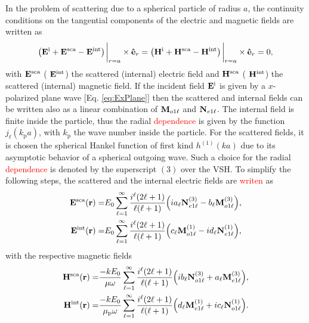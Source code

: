 In the problem of scattering due to a spherical particle of radius $a$, the continuity conditions on the tangential components of the electric and magnetic fields are written as
 \begin{align}
 \qty(\vb{E}^\text{i} + \vb{E}^\text{sca}- \vb{E}^\text{int})\eval_{r=a}\times \vu{e}_r  =
  \qty(\vb{H}^\text{i} + \vb{H}^\text{sca} - \vb{H}^\text{int})\eval_{r=a} \times\vu{e}_r = 0,
  \label{eq:contuinity}
 \end{align}
with  $\vb{E}^\text{sca}$ ( $\vb{E}^\text{int}$) the scattered (internal) electric field and  $\vb{H}^\text{sca}$ ( $\vb{H}^\text{int}$) the scattered (internal) magnetic field. If the incident field $\vb{E}^\text{i}$ is given by a $x$-polarized plane wave [Eq. \eqref{eq:ExPlane}] then the scattered and internal fields can be written also as a linear combination of $\vb{M}_{o1\ell}$ and $\vb{N}_{e1\ell}$. The internal field is finite inside the particle, thus the radial \textcolor{red}{dependence} is given by the function $j_\ell(k_\text{p} a)$, with $k_\text{p}$ the wave number inside the particle. For the scattered fields, it is chosen the spherical Hankel function of first kind $h^{(1)}(ka)$ due to its asymptotic behavior of a spherical outgoing wave. Such a choice for the radial \textcolor{red}{dependence} is denoted by the superscript $(3)$ over the VSH. To simplify the following steps, the scattered and the internal electric fields are \textcolor{red}{writen} as
  \begin{subequations}
 \begin{align}
 \vb{E}^\text{sca} (\vb{r})=& E_0 \sum_{\ell = 1}^\infty\frac{i^\ell(2\ell+1)}{\ell(\ell+1)}\qty(i a_\ell \vb{N}_{e1\ell}^{(3)} -b_\ell \vb{M}_{o1\ell}^{(3)}),
 \label{eq:EscaLC}\\
 \vb{E}^\text{int} (\vb{r})=& E_0 \sum_{\ell = 1}^\infty\frac{i^\ell(2\ell+1)}{\ell(\ell+1)}\qty( c_\ell\vb{M}_{o1\ell}^{(1)} - i d_\ell \vb{N}_{e1\ell}^{(1)}),
 \label{eq:EscaInt}
  \end{align}
 \end{subequations}
with the respective magnetic fields
    \begin{subequations}
 \begin{align}
 \vb{H}^\text{sca} (\vb{r})=& \frac{-kE_0}{\mu\omega} \sum_{\ell = 1}^\infty\frac{i^\ell(2\ell+1)}{\ell(\ell+1)}\qty(i b_\ell \vb{N}_{o1\ell}^{(3)} +a_\ell \vb{M}_{e1\ell}^{(3)}),\\
 \vb{H}^\text{int} (\vb{r})=& \frac{-kE_0}{\mu_\text{p}\omega} \sum_{\ell = 1}^\infty\frac{i^\ell(2\ell+1)}{\ell(\ell+1)}\qty( d_\ell\vb{M}_{e1\ell}^{(1)} + i c_\ell \vb{N}_{o1\ell}^{(1)}).
 \end{align}%
\label{eq:HscaInt}%
 \end{subequations}%
